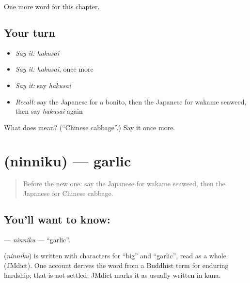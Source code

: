 \begin{grammarlens}[title={What you've built}]
One more word for this chapter.
\end{grammarlens}

\subsection*{Your turn}
\begin{itemize}
\raggedright
  \item \emph{Say it:} \emph{hakusai}
  \item \emph{Say it:} \emph{hakusai}, once more
  \item \emph{Say it:} say \emph{hakusai}
  \item \emph{Recall:} say the Japanese for a bonito, then the Japanese for wakame seaweed, then say \emph{hakusai} again
\end{itemize}

\begin{tcolorbox}[breakable,colback=teal!4,colframe=teal!35!black,title={Before you move on}]
What does  mean? (\textquotedblleft{}Chinese cabbage\textquotedblright{}.) Say it once more.
\end{tcolorbox}
\section[\texorpdfstring{\ja{にんにく} (ninniku)}{にんにく (ninniku)}]{ (ninniku) — garlic}

\label{lesson:JA-C114-ninniku}



\begin{quote}
Before the new one: say the Japanese for wakame seaweed, then the Japanese for Chinese cabbage.
\end{quote}

\subsection*{You'll want to know: }
\textbf{} — \emph{ninniku} — \textquotedblleft{}garlic\textquotedblright{}.

\begin{cousinweb}
\textbf{} (\emph{ninniku}) is written with characters for \textquotedblleft{}big\textquotedblright{} and \textquotedblleft{}garlic\textquotedblright{}, read as a whole (JMdict). One account derives the word from a Buddhist term for enduring hardship; that is not settled. JMdict marks it as usually written in kana.
\end{cousinweb}

